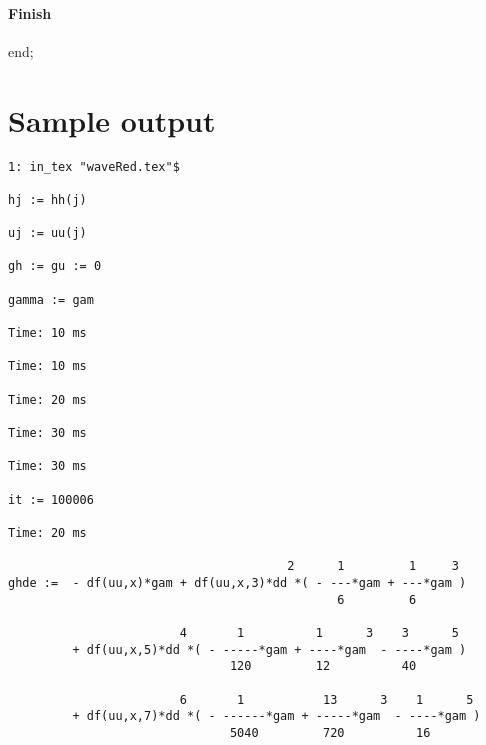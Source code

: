 \documentclass[10pt,a5paper]{article}
\begin{document}
\paragraph{Finish}
\begin{reduce}
end;
\end{reduce}

\section{Sample output}
\begin{verbatim}
1: in_tex "waveRed.tex"$

hj := hh(j)

uj := uu(j)

gh := gu := 0

gamma := gam

Time: 10 ms

Time: 10 ms

Time: 20 ms

Time: 30 ms

Time: 30 ms

it := 100006

Time: 20 ms

                                       2      1         1     3
ghde :=  - df(uu,x)*gam + df(uu,x,3)*dd *( - ---*gam + ---*gam )
                                              6         6

                        4       1          1      3    3      5
         + df(uu,x,5)*dd *( - -----*gam + ----*gam  - ----*gam )
                               120         12          40

                        6       1           13      3    1      5
         + df(uu,x,7)*dd *( - ------*gam + -----*gam  - ----*gam )
                               5040         720          16

\end{verbatim}
\end{document}
